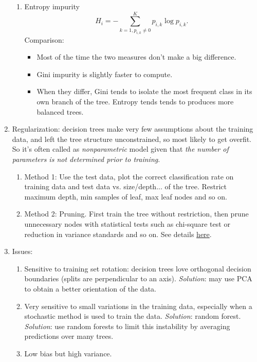 \documentclass[12pt,oneside,a4paper]{article}
\numberwithin{equation}{section}
\begin{document}
\begin{enumerate}
\begin{enumerate}
\item Entropy impurity
\begin{equation}
H_i = - \sum_{k=1, p_{i, k} \neq 0}^{K} p_{i,k} \log p_{i,k}.
\end{equation}
Comparison:
\begin{itemize}
\item  Most of the time the two measures don't make a big difference. 
\item  Gini impurity is slightly faster to compute. 
\item When they differ, Gini tends to isolate the most frequent class in its own branch of the tree. Entropy tends tends to produces more balanced trees.
\end{itemize}
\end{enumerate}
\item Regularization: decision trees make very few assumptions about the training data, and left the tree structure unconstrained, so most likely to get overfit. So it's often called as \emph{nonparametric} model given that \emph{the number of parameters is not determined prior to training}.
\begin{enumerate}
\item Method 1: Use the test data, plot the correct classification rate on training data and test data vs. size/depth... of the tree. Restrict maximum depth, min samples of leaf, max leaf nodes and so on. 
\item Method 2: Pruning. First train the tree without restriction, then prune unnecessary nodes with statistical tests such as chi-square test or reduction in variance standards and so on. See details \href{https://medium.com/@rishabhjain_22692/decision-trees-it-begins-here-93ff54ef134}{here}.

\end{enumerate}
\item Issues:
\begin{enumerate}
\item Sensitive to training set rotation: decision trees love orthogonal decision boundaries (splits are perpendicular to an axis). \emph{Solution}: may use PCA to obtain a better orientation of the data. 

\item Very sensitive to small variations in the training data, especially when a stochastic method is used to train the data. \emph{Solution}: random forest. \emph{Solution}: use random forests to limit this instability by averaging predictions over many trees. 

\item Low bias but high variance.
\end{enumerate}
\end{enumerate}
\end{document}
